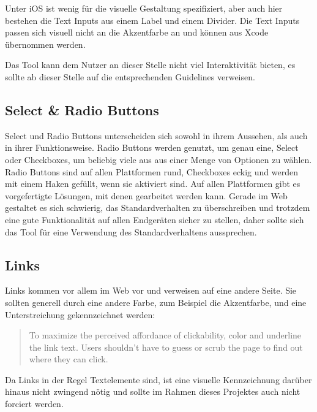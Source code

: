 Unter iOS ist wenig für die visuelle Gestaltung spezifiziert, aber auch hier bestehen die Text Inputs aus einem Label und einem Divider. Die Text Inputs passen sich visuell nicht an die Akzentfarbe an und können aus Xcode übernommen werden.

Das Tool kann dem Nutzer an dieser Stelle nicht viel Interaktivität bieten, es sollte ab dieser Stelle auf die entsprechenden Guidelines verweisen.

\subsection{Select \& Radio Buttons}
Select und Radio Buttons unterscheiden sich sowohl in ihrem Aussehen, als auch in ihrer Funktionsweise. Radio Buttons werden genutzt, um genau eine, Select oder Checkboxes, um beliebig viele aus aus einer Menge von Optionen zu wählen. Radio Buttons sind auf allen Plattformen rund, Checkboxes eckig und werden mit einem Haken gefüllt, wenn sie aktiviert sind. Auf allen Plattformen gibt es vorgefertigte Lösungen, mit denen gearbeitet werden kann. Gerade im Web gestaltet es sich schwierig, das Standardverhalten zu überschreiben und trotzdem eine gute Funktionalität auf allen Endgeräten sicher zu stellen, daher sollte sich das Tool für eine Verwendung des Standardverhaltens aussprechen.

\subsection{Links}
Links kommen vor allem im Web vor und verweisen auf eine andere Seite.
Sie sollten generell durch eine andere Farbe, zum Beispiel die Akzentfarbe, und eine Unterstreichung gekennzeichnet werden:

\begin{quote}
To maximize the perceived affordance of clickability, color and underline the link text. Users shouldn't have to guess or scrub the page to find out where they can click. \cite{nielsen2004guide}
\end{quote}

Da Links in der Regel Textelemente sind, ist eine visuelle Kennzeichnung darüber hinaus nicht zwingend nötig und sollte im Rahmen dieses Projektes auch nicht forciert werden.
